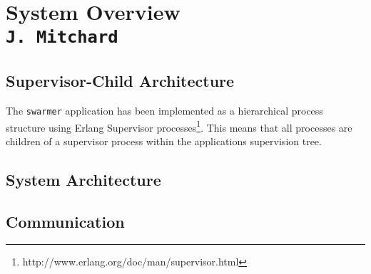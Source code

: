 \pagestyle{empty}
\section{System Overview\\{\small\tt J.~Mitchard}}

\subsection{Supervisor-Child Architecture}
The \verb+swarmer+ application has been implemented as a hierarchical process structure using Erlang Supervisor processes\footnote{http://www.erlang.org/doc/man/supervisor.html}. This means that all processes are children of a supervisor process within the applications supervision tree.


\subsection{System Architecture}

\subsection{Communication}

\clearpage
\endinput
